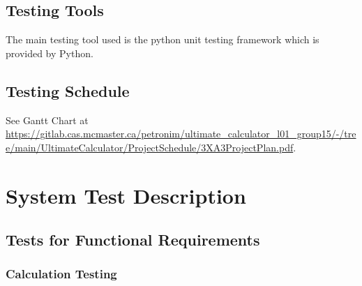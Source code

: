 \documentclass[12pt, titlepage]{article}
\begin{document}
\subsection{Testing Tools}
The main testing tool used is the python unit testing framework which is provided by Python. 

\subsection{Testing Schedule}
		
See Gantt Chart at \url{https://gitlab.cas.mcmaster.ca/petronim/ultimate_calculator_l01_group15/-/tree/main/UltimateCalculator/ProjectSchedule/3XA3ProjectPlan.pdf}.

\section{System Test Description}
	
\subsection{Tests for Functional Requirements}

\subsubsection{Calculation Testing}
		
\end{document}
